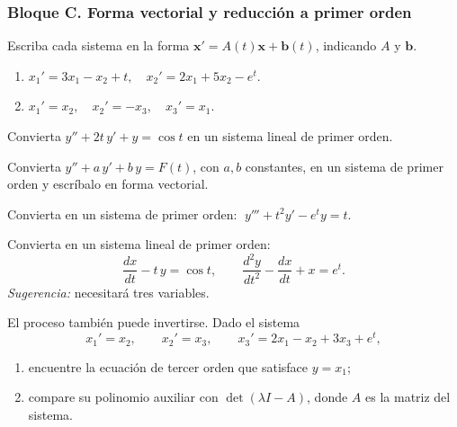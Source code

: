 \subsubsection*{Bloque C. Forma vectorial y reducción a primer orden}

\begin{exercise}[\est{1}]\label{ex:C1}
Escriba cada sistema en la forma $\mathbf{x}' = A(t)\mathbf{x} + \mathbf{b}(t)$, indicando $A$ y $\mathbf{b}$.
\begin{enumerate}[a]
    \item $x_1' = 3x_1 - x_2 + t, \quad x_2' = 2x_1 + 5x_2 - e^t.$
    \item $x_1' = x_2, \quad x_2' = -x_3, \quad x_3' = x_1.$
\end{enumerate}
\end{exercise}

\begin{exercise}[\est{1}]\label{ex:C2}
Convierta $y'' + 2t\,y' + y = \cos t$ en un sistema lineal de primer orden.
\end{exercise}

\begin{exercise}[\est{1}]\label{ex:C3}
Convierta $y'' + a\,y' + b\,y = F(t)$, con $a,b$ constantes, en un sistema de primer orden y escríbalo en forma vectorial.
\end{exercise}

\begin{exercise}[\est{2}]\label{ex:C4}
Convierta en un sistema de primer orden: $\;y''' + t^2 y' - e^t y = t.$
\end{exercise}

\begin{exercise}[\est{2}]\label{ex:C5}
Convierta en un sistema lineal de primer orden:
\[
\frac{dx}{dt} - t\,y = \cos t, \qquad \frac{d^2y}{dt^2} - \frac{dx}{dt} + x = e^t.
\]
\emph{Sugerencia:} necesitará tres variables.
\end{exercise}

\begin{exercise}[\est{2}]\label{ex:C6}
El proceso también puede invertirse. Dado el sistema
\[
x_1' = x_2, \qquad x_2' = x_3, \qquad x_3' = 2x_1 - x_2 + 3x_3 + e^t,
\]
\begin{enumerate}[a]
    \item encuentre la ecuación de tercer orden que satisface $y = x_1$;
    \item compare su polinomio auxiliar con $\det(\lambda I - A)$, donde $A$ es la matriz del sistema.
\end{enumerate}
\end{exercise}

